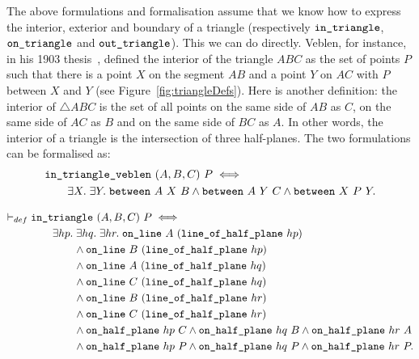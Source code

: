The above formulations and formalisation assume that we know how to express the interior, exterior and boundary of a triangle (respectively $\texttt{in\_triangle}$, $\texttt{on\_triangle}$ and $\texttt{out\_triangle}$). This we can do directly. Veblen, for instance, in his 1903 thesis~\cite{Veblenphd}, defined the interior of the triangle $ABC$ as the set of points $P$ such that there is a point $X$ on the segment $AB$ and a point $Y$ on $AC$ with $P$ between $X$ and $Y$ (see Figure~\ref{fig:triangleDefs}). Here is another definition: the interior of $\triangle ABC$ is the set of all points on the same side of $AB$ as $C$, on the same side of $AC$ as $B$ and on the same side of $BC$ as $A$. In other words, the interior of a triangle is the intersection of three half-planes. The two formulations can be formalised as:
\begin{equation*}
\begin{split}
  &\texttt{in\_triangle\_veblen}\ (A,B,C)\ P \iff\\
  &\qquad\exists X.\;\exists Y.\; \texttt{between}\ A\ X\ B \wedge \texttt{between}\ A\ Y\ C \wedge \texttt{between}\ X\ P\ Y.
\end{split}
\end{equation*}

\begin{equation}\label{eq:inTriangleDef}
\begin{split}
  \vdash_{def}\;&\code{in\_triangle}\ (A,B,C)\ P \iff\\
    &\qquad\exists hp.\;\exists hq.\;\exists hr.\;\code{on\_line}\ A\ (\code{line\_of\_half\_plane}\ hp)\\
    &\qquad\qquad\wedge \code{on\_line}\ B\ (\code{line\_of\_half\_plane}\  hp)\\
    &\qquad\qquad\wedge \code{on\_line}\ A\ (\code{line\_of\_half\_plane}\  hq)\\
    &\qquad\qquad\wedge \code{on\_line}\ C\ (\code{line\_of\_half\_plane}\  hq)\\
    &\qquad\qquad\wedge \code{on\_line}\ B\ (\code{line\_of\_half\_plane}\  hr)\\
    &\qquad\qquad\wedge \code{on\_line}\ C\ (\code{line\_of\_half\_plane}\  hr)\\
    &\qquad\qquad\wedge \code{on\_half\_plane}\ hp\ C \wedge \code{on\_half\_plane}\ hq\ B \wedge \code{on\_half\_plane}\ hr\ A\\
    &\qquad\qquad\wedge \code{on\_half\_plane}\ hp\ P \wedge \code{on\_half\_plane}\ hq\ P \wedge \code{on\_half\_plane}\ hr\ P.
\end{split}
\end{equation}

